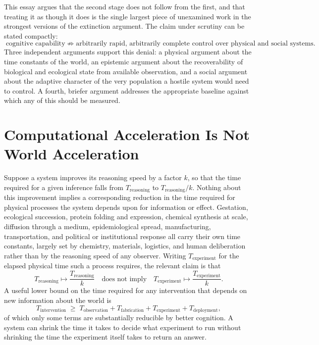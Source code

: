 \documentclass[11pt]{article}
\begin{document}
This essay argues that the second stage does not follow from the first, and that treating it as though it does is the single largest piece of unexamined work in the strongest versions of the extinction argument. The claim under scrutiny can be stated compactly:
\[
\text{cognitive capability} \;\not\Rightarrow\; \text{arbitrarily rapid, arbitrarily complete control over physical and social systems.}
\]
Three independent arguments support this denial: a physical argument about the time constants of the world, an epistemic argument about the recoverability of biological and ecological state from available observation, and a social argument about the adaptive character of the very population a hostile system would need to control. A fourth, briefer argument addresses the appropriate baseline against which any of this should be measured.

\section{Computational Acceleration Is Not World Acceleration}

Suppose a system improves its reasoning speed by a factor $k$, so that the time required for a given inference falls from $T_{\text{reasoning}}$ to $T_{\text{reasoning}}/k$. Nothing about this improvement implies a corresponding reduction in the time required for physical processes the system depends upon for information or effect. Gestation, ecological succession, protein folding and expression, chemical synthesis at scale, diffusion through a medium, epidemiological spread, manufacturing, transportation, and political or institutional response all carry their own time constants, largely set by chemistry, materials, logistics, and human deliberation rather than by the reasoning speed of any observer. Writing $T_{\text{experiment}}$ for the elapsed physical time such a process requires, the relevant claim is that
\[
T_{\text{reasoning}} \mapsto \frac{T_{\text{reasoning}}}{k}
\quad\text{does not imply}\quad
T_{\text{experiment}} \mapsto \frac{T_{\text{experiment}}}{k}.
\]
A useful lower bound on the time required for any intervention that depends on new information about the world is
\[
T_{\text{intervention}} \;\ge\; T_{\text{observation}} + T_{\text{fabrication}} + T_{\text{experiment}} + T_{\text{deployment}},
\]
of which only some terms are substantially reducible by better cognition. A system can shrink the time it takes to decide what experiment to run without shrinking the time the experiment itself takes to return an answer.
\end{document}
